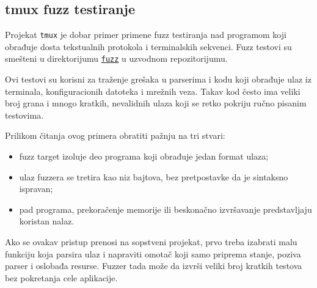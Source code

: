 \subsection{tmux fuzz testiranje}\label{tmux-fuzz-testiranje}

Projekat \texttt{tmux} je dobar primer primene fuzz testiranja nad programom koji obrađuje dosta tekstualnih protokola i terminalskih sekvenci. Fuzz testovi su smešteni u direktorijumu \href{https://github.com/tmux/tmux/tree/master/fuzz}{\texttt{fuzz}} u uzvodnom repozitorijumu.

Ovi testovi su korisni za traženje grešaka u parserima i kodu koji obrađuje ulaz iz terminala, konfiguracionih datoteka i mrežnih veza. Takav kod često ima veliki broj grana i mnogo kratkih, nevalidnih ulaza koji se retko pokriju ručno pisanim testovima.

Prilikom čitanja ovog primera obratiti pažnju na tri stvari:

\begin{itemize}
\tightlist
\item
  fuzz target izoluje deo programa koji obrađuje jedan format ulaza;
\item
  ulaz fuzzera se tretira kao niz bajtova, bez pretpostavke da je sintaksno ispravan;
\item
  pad programa, prekoračenje memorije ili beskonačno izvršavanje predstavljaju koristan nalaz.
\end{itemize}

Ako se ovakav pristup prenosi na sopstveni projekat, prvo treba izabrati malu funkciju koja parsira ulaz i napraviti omotač koji samo priprema stanje, poziva parser i oslobađa resurse. Fuzzer tada može da izvrši veliki broj kratkih testova bez pokretanja cele aplikacije.
